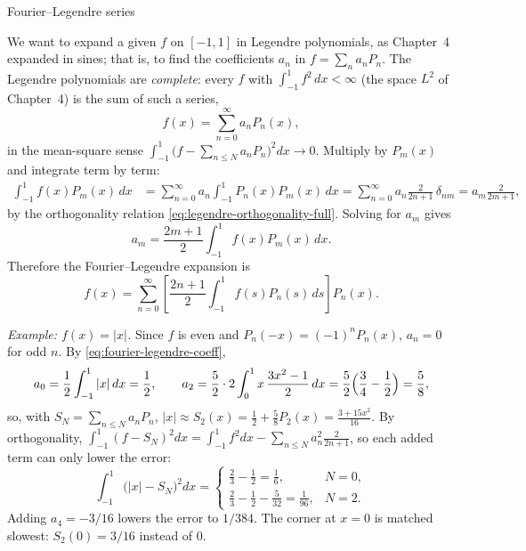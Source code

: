 \documentclass[11pt]{beamer}
\begin{document}
\begin{frame}[allowframebreaks=1.00]{Fourier--Legendre series}
\footnotesize

We want to expand a given $f$ on $[-1,1]$ in Legendre polynomials, as Chapter~4 expanded
in sines; that is, to find the coefficients $a_n$ in $f=\sum_n a_nP_n$. The Legendre polynomials are \emph{complete}: every $f$ with $\int_{-1}^1 f^2\,dx<\infty$ (the space
$L^2$ of Chapter~4) is the sum of such a series,
\[
  f(x)=\sum_{n=0}^{\infty}a_nP_n(x),
\]
in the mean-square sense $\int_{-1}^1\bigl(f-\sum_{n\le N}a_nP_n\bigr)^2dx\to0$.
Multiply by $P_m(x)$ and integrate term by term:
\begin{align*}
  \int_{-1}^{1}f(x)P_m(x)\,dx
  &=\sum_{n=0}^{\infty}a_n
    \int_{-1}^{1}P_n(x)P_m(x)\,dx
  =\sum_{n=0}^{\infty}a_n\frac{2}{2n+1}\,\delta_{nm}
  =a_m\frac{2}{2m+1},
\end{align*}
by the orthogonality relation \eqref{eq:legendre-orthogonality-full}.
Solving for $a_m$ gives
\begin{equation}
  a_m=\frac{2m+1}{2}\int_{-1}^{1}f(x)P_m(x)\,dx.
  \label{eq:fourier-legendre-coeff}
\end{equation}
Therefore the Fourier--Legendre expansion is
\begin{equation}
  f(x)=\sum_{n=0}^{\infty}
  \left[\frac{2n+1}{2}\int_{-1}^{1}f(s)P_n(s)\,ds\right]P_n(x).
  \label{eq:fourier-legendre}
\end{equation}

\emph{Example: $f(x)=|x|$.} Since $f$ is even and $P_n(-x)=(-1)^nP_n(x)$, $a_n=0$ for odd $n$. By \eqref{eq:fourier-legendre-coeff},
\[
  a_0=\frac12\int_{-1}^1|x|\,dx=\frac12,\qquad
  a_2=\frac52\cdot2\int_0^1x\,\frac{3x^2-1}{2}\,dx=\frac52\Bigl(\frac34-\frac12\Bigr)=\frac58,
\]
so, with $S_N=\sum_{n\le N}a_nP_n$, $|x|\approx S_2(x)=\frac12+\frac58P_2(x)=\frac{3+15x^2}{16}$.
By orthogonality, $\int_{-1}^1(f-S_N)^2dx=\int_{-1}^1f^2dx-\sum_{n\le N}a_n^2\frac{2}{2n+1}$, so each
added term can only lower the error:
\[
  \int_{-1}^1\bigl(|x|-S_N\bigr)^2dx=
  \begin{cases}\frac23-\frac12=\frac16,&N=0,\\[2pt] \frac23-\frac12-\frac{5}{32}=\frac1{96},&N=2.\end{cases}
\]
Adding $a_4=-3/16$ lowers the error to $1/384$. The corner at $x=0$ is matched slowest:
$S_2(0)=3/16$ instead of $0$.
\end{frame}
\end{document}
